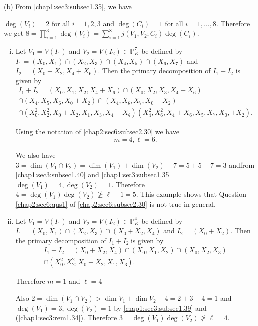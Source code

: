 \begin{enumerate}[(i)]
(b) From \ref{chap1:sec3:subsec1.35}, we have

$\deg (V_i) = 2$ for all $i = 1,2,3$ and $\deg (C_i) = 1$ for all $i =
1,\ldots,8$. Therefore we get  $8 =\prod\limits_{i=1}^3 \deg (V_i) =
\sum\limits_{i=1}^8 j(V_1, V_2;C_i) \deg (C_i)$.  
\end{enumerate}

\setcounter{examples}{13}
\begin{examples}\label{chap3:sec1:exp3.14}
\begin{enumerate}[(i)] 
\item Let $V_1 =V(I_1)$ and $V_2 =V(I_2) \subset \mathbb{P}^7_K$ be
  defined  by $I_1 = (X_0,X_1) \cap (X_2,X_3) \cap (X_4,X_5) \cap
  (X_6,X_7) $ and $I_2= (X_0 +X_2,X_4+X_6)$. Then the primary
  decomposition of $I_1 + I_2$ is given by   
{\fontsize{10pt}{12pt}\selectfont
  \begin{multline*}
    I_1+ I_2 =(X_0,X_1,X_2,X_4+X_6) \cap (X_0,X_2,X_3,X_4+X_6)\\ 
    \cap (X_4,X_5,X_6,X_0+X_2) \cap (X_4,X_6,X_7,X_0+X_2)\\ 
    \cap (X_0^2,X_2^2,X_0+X_2,X_1,X_3,X_4+X_6)
    (X_4^2,X_6^2,X_4+X_6,X_5,X_7,X_0,+X_2). 
  \end{multline*}}\relax

  Using the notation of \ref{chap2:sec6:subsec2.30} we have
  $$
  m = 4, \ell =6.
  $$

  We also have $3 =\dim (V_1 \cap V_2) = \dim (V_1) + \dim
  (V_2)-7=5+5-7=3$ and\pageoriginale from \ref{chap1:sec3:subsec1.40}
  and \ref{chap1:sec3:subsec1.35} $\deg (V_{1}) = 4, \deg (V_{2}) = 1$.  
  Therefore $4 = \deg (V_{1}) \deg (V_{2}) \not \ge \ell - 1 = 5$. 
  This example shows that Question \ref{chap2:sec6:qus1} of
  \ref{chap2:sec6:subsec2.30} is not true in general.  
\item Let $V_{1} = V(I_{1})$ and $V_{2} = V(I_{2}) \subset
  \mathbb{P}^{4}_{K}$ be defined by $I_{1} = (X_{0}, X_{1}) \cap
  (X_{2}, X_{3}) \cap (X_{0} + X_{2}, X_{4})$ and $I_{2} = (X_{0}+
  X_{2})$. Then the primary decomposition of $I_{1} + I_{2}$ is given
  by  
  \begin{multline*}
  I_{1} + I_{2} = (X_{0} + X_{2}, X_{4}) \cap (X_{0}, X_{1}, X_{2})
  \cap (X_{0}, X_{2}, X_{3})\\ 
  \cap (X^{2}_{0},X^{2}_{2}, X_{0} + X_{2}, X_{1}, X_{3} ). 
  \end{multline*}

  Therefore $m = 1$ and $\ell = 4$

  Also $2 = \dim (V_{1} \cap V_{2}) > \dim V_1+ \dim V_{2} -4 = 2 + 3 -4 = 1$
  and $\deg (V_{1}) = 3, \deg (V_{2}) = 1$ by \ref{chap1:sec3:subsec1.39} and
  (\ref{chap1:sec3:rem1.34}). Therefore $3 = \deg (V_{1}) \deg (V_{2})
  \not \ge \ell = 4$. 
  

\end{enumerate}
\end{examples}
